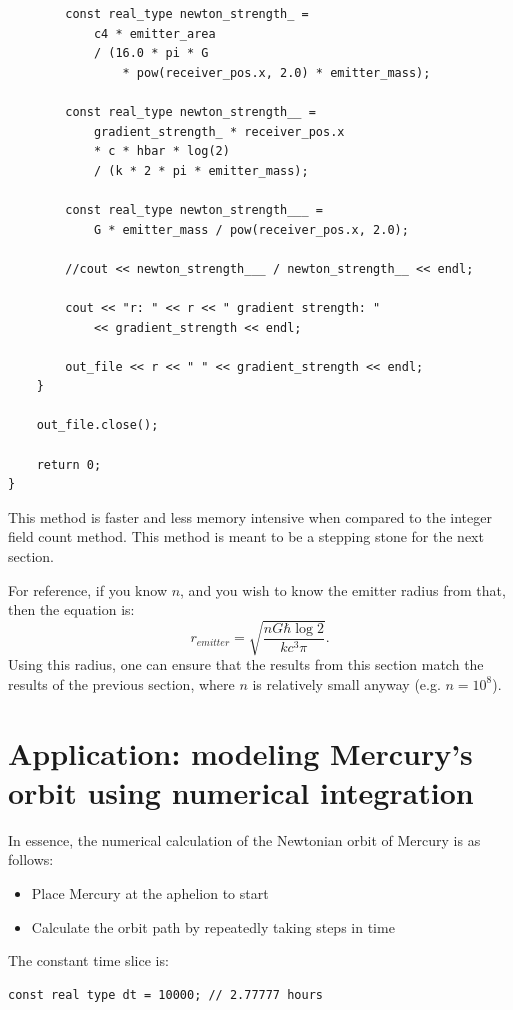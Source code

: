 \documentclass[12pt]{article}
\begin{document}
\begin{lstlisting}
		const real_type newton_strength_ =
			c4 * emitter_area
			/ (16.0 * pi * G 
				* pow(receiver_pos.x, 2.0) * emitter_mass);

		const real_type newton_strength__ =
			gradient_strength_ * receiver_pos.x 
			* c * hbar * log(2)
			/ (k * 2 * pi * emitter_mass);

		const real_type newton_strength___ =
			G * emitter_mass / pow(receiver_pos.x, 2.0);

		//cout << newton_strength___ / newton_strength__ << endl;

		cout << "r: " << r << " gradient strength: "
			<< gradient_strength << endl;

		out_file << r << " " << gradient_strength << endl;
	}

	out_file.close();

	return 0;
}
\end{lstlisting}

This method is faster and less memory intensive when compared to the integer field count method.
This method is meant to be a stepping stone for the next section.

For reference, if you know $n$, and you wish to know the emitter radius from that, then the equation is:
\begin{equation}
r_{\textit{emitter}} = \sqrt{\frac{n G \hbar \log 2}{k c^3 \pi}}.
\end{equation}
Using this radius, one can ensure that the results from this section match the results of the previous section, where $n$ is relatively small anyway (e.g. $n = 10^8$).




\section{Application: modeling Mercury's orbit using numerical integration}

In essence, the numerical calculation of the Newtonian orbit of Mercury is as follows:
\begin{itemize}
\item Place Mercury at the aphelion to start
\item Calculate the orbit path by repeatedly taking steps in time
\end{itemize}

The constant time slice is:
\begin{lstlisting}
const real type dt = 10000; // 2.77777 hours
\end{lstlisting}
\end{document}
